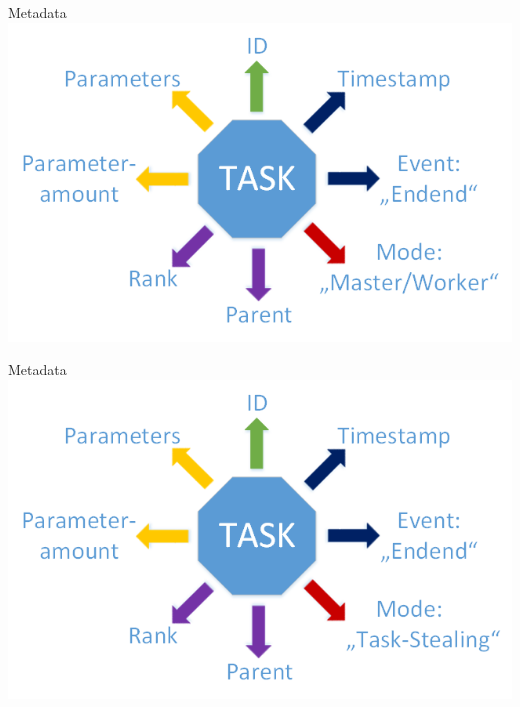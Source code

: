 	\begin{frame}{Metadata}
	\includegraphics[width=1.0\textwidth]{images/Task/Zeichnung3.png}
	\end{frame}
	
	\begin{frame}{Metadata}
	\includegraphics[width=1.0\textwidth]{images/Zeichnungedited.png}
	\end{frame}
	

